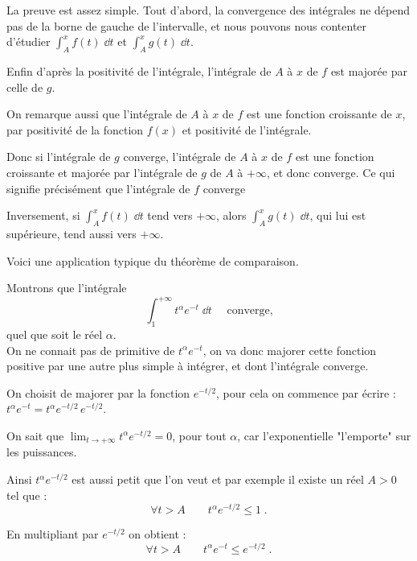  \change
La preuve est assez simple.
Tout d'abord, la convergence des intégrales ne dépend pas de la borne 
de gauche de l'intervalle, et nous pouvons nous contenter d'étudier 
$\int_A^x f(t)\;\dd t$ et $\int_A^x g(t)\;\dd t$.

Enfin d'après la positivité de l'intégrale, l'intégrale de $A$ à $x$ 
de $f$ est majorée par celle de $g$.

\change
On remarque aussi que l'intégrale de $A$ à $x$ de $f$ est une 
fonction croissante de $x$, par positivité de la fonction $f(x)$
et positivité de l'intégrale.

Donc si l'intégrale de $g$ converge, l'intégrale de $A$ à $x$ 
de $f$ est une fonction croissante et majorée par 
l'intégrale de $g$ de $A$ à $+\infty$, et donc converge. 
Ce qui signifie précisément que  l'intégrale de $f$ converge

\change
Inversement, si $\int_A^{x} f(t)\;\dd t$ tend vers $+\infty$, 
alors $\int_A^{x} g(t)\;\dd t$, qui lui est supérieure,
tend aussi vers $+\infty$.
 
\diapo

Voici une application typique du théorème de comparaison.

Montrons que l'intégrale 
$$\int_1^{+\infty} t^\alpha e^{-t}\;\dd t\quad\text{ converge,}$$
quel que soit le réel $\alpha$. 
\\

On ne connait pas de primitive de $t^\alpha e^{-t}$, on va donc 
majorer cette fonction positive par une autre plus simple à 
intégrer, et dont l'intégrale converge. 

\change
On choisit de majorer par la fonction $e^{-t/2}$, pour cela on 
commence par écrire : $t^\alpha e^{-t} = t^\alpha e^{-t/2}\,e^{-t/2}$.
  
\change

On sait que $\lim_{t\rightarrow+\infty} t^\alpha e^{-t/2} =0$, 
pour tout $\alpha$,  car l'exponentielle "l'emporte" sur les 
puissances.

\change

Ainsi $t^\alpha e^{-t/2}$ est aussi petit que l'on veut et par exemple 
il existe un réel $A>0$ tel que :
$$\forall t>A\qquad t^\alpha e^{-t/2}\le 1\;.$$ 

\change

En multipliant par $e^{-t/2}$ on obtient :
$$\forall t>A\qquad t^\alpha e^{-t}\le e^{-t/2}\;.$$

\change

